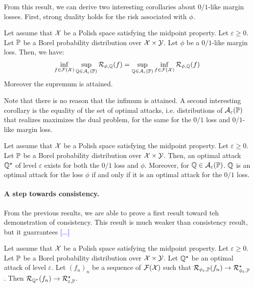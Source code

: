 From this result, we can derive two interesting corollaries about  $0/1$-like margin losses. First, strong duality holds for the risk associated with ${\phi}$.

\begin{coro} 
\label{coro:nash}
Let assume that $\mathcal{X}$ be a Polish space satisfying the midpoint property. Let $\varepsilon\geq 0$. Let $\mathbb{P}$ be a Borel probability distribution over $\mathcal{X}\times\mathcal{Y}$. Let ${\phi}$ be a $0/1$-like margin loss. Then, we have:
\begin{align*}
\inf_{f\in\mathcal{F}(\mathcal{X})}\sup_{\mathbb{Q}\in\mathcal{A}_\varepsilon(\mathbb{P})} \mathcal{R}_{\phi,\mathbb{Q}}(f) =    \sup_{\mathbb{Q}\in\mathcal{A}_\varepsilon(\mathbb{P})} \inf_{f\in\mathcal{F}(\mathcal{X})} \mathcal{R}_{\phi,\mathbb{Q}}(f)
\end{align*}
Moreover the supremum is attained.
\end{coro}

Note that there is no reason that the infimum is attained. A second interesting corollary is the equality of the set of optimal attacks, i.e. distributions of $\mathcal{A}_\varepsilon(\mathbb{P})$ that realizes maximizes the dual problem, for the same for the $0/1$ loss and $0/1$-like margin loss.


\begin{coro}
\label{coro:optattacks}
Let assume that $\mathcal{X}$ be a Polish space satisfying the midpoint property. Let $\varepsilon\geq 0$. Let $\mathbb{P}$ be a Borel probability distribution over $\mathcal{X}\times\mathcal{Y}$. Then, an optimal attack $\mathbb{Q}^\star$  of level $\varepsilon$  exists for both the $0/1$ loss and  $\phi$. Moreover, for $\mathbb{Q}\in\mathcal{A}_\varepsilon(\mathbb{P})$.  $\mathbb{Q}$ is an optimal attack for the loss $\phi$  if and only if it is an optimal attack for the $0/1$ loss.
\end{coro}


\paragraph{A step towards consistency.} From the previous results, we are able to prove a first result toward teh demonstration of consistency. This result is much weaker than consistency result, but it guarrantees \textcolor{blue}{[...]}
\begin{prop}
\label{prop:pseudo}
Let assume that $\mathcal{X}$ be a Polish space satisfying the midpoint property. Let $\varepsilon\geq 0$. Let $\mathbb{P}$ be a Borel probability distribution over $\mathcal{X}\times\mathcal{Y}$.  Let $\mathbb{Q}^\star$ be an optimal attack of level $\varepsilon$. Let $(f_n)_n$ be a sequence of $\mathcal{F}(\mathcal{X})$ such that $\mathcal{R}_{\phi_\varepsilon,\mathbb{P}}(f_n)\to\mathcal{R}_{\phi_\varepsilon,\mathbb{P}}^\star$. Then $\mathcal{R}_{\mathbb{Q}^\star}(f_n)\to\mathcal{R}_{\varepsilon,\mathbb{P}}^\star$.
\end{prop}


